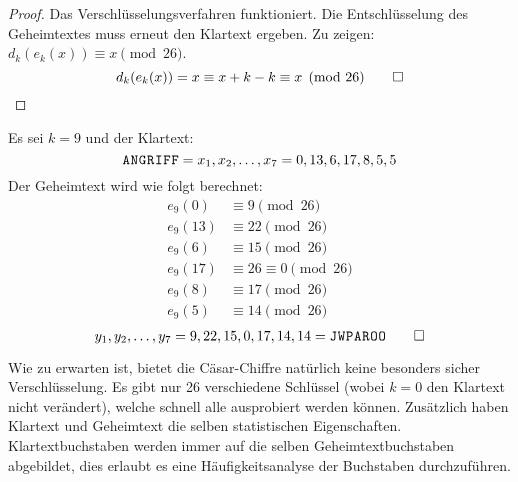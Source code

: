 \noindent
\begin{proof}
  Das Verschlüsselungsverfahren funktioniert.
  Die Entschlüsselung des Geheimtextes muss erneut den Klartext ergeben.
  Zu zeigen: $d_k(e_k(x)) \equiv x \pmod{26}$.
  \begin{equation*}
    d_k(e_k(x)) = x \equiv x + k - k \equiv x \pmod{26} \qedhere
  \end{equation*}
\end{proof}
\begin{example}
  Es sei $k = 9$ und der Klartext:
  \begin{equation*}
    \text{\texttt{A\kern 0.2mmN\kern 0.2mmG\kern 0.2mmR\kern 0.2mmI\kern 0.2mmF\kern 0.2mmF}}
    = x_1,x_2,\dots,x_7 = 0,13,6,17,8,5,5
  \end{equation*}
  Der Geheimtext wird wie folgt berechnet:
  \begin{align*}
    e_9(0)  & \equiv 9 \pmod{26}           \\
    e_9(13) & \equiv 22 \pmod{26}          \\
    e_9(6)  & \equiv 15 \pmod{26}          \\
    e_9(17) & \equiv 26 \equiv 0 \pmod{26} \\
    e_9(8)  & \equiv 17 \pmod{26}          \\
    e_9(5)  & \equiv 14 \pmod{26}
  \end{align*}
  \begin{equation*}
    y_1,y_2,\dots,y_7 = 9,22,15,0,17,14,14 =
    \text{\texttt{J\kern 0.2mmW\kern 0.2mmP\kern 0.2mmA\kern 0.2mmR\kern 0.2mmO\kern 0.2mmO}} \qedhere
  \end{equation*}
\end{example}

\noindent
Wie zu erwarten ist, bietet die Cäsar-Chiffre natürlich keine besonders sicher Verschlüs\-selung.
Es gibt nur 26 verschiedene Schlüssel (wobei $k = 0$ den Klartext nicht verändert),
welche schnell alle ausprobiert werden können. Zusätzlich
haben Klartext und Geheimtext die selben statistischen Eigenschaften.
Klartextbuchstaben werden immer auf die selben Geheimtextbuchstaben abgebildet, dies
erlaubt es eine Häufigkeitsanalyse der Buchstaben durchzuführen.